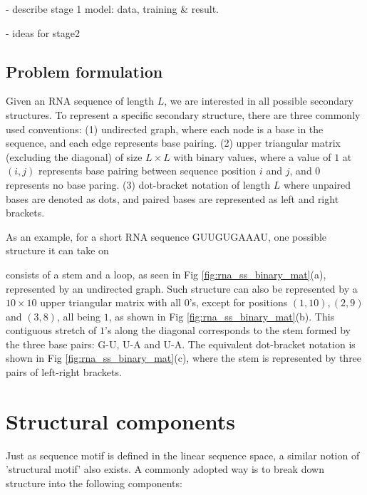 \documentclass[12pt]{article}
\begin{document}
- describe stage 1 model: data, training & result.


- ideas for stage2


\subsection{Problem formulation}

Given an RNA sequence of length $L$, we are interested in all possible secondary structures.
To represent a specific secondary structure, there are three commonly used conventions:
(1) undirected graph, where each node is a base in the sequence, and each edge represents base pairing.
(2) upper triangular matrix (excluding the diagonal)
of size $L \times L$ with binary values, where a value of $1$ at $(i, j)$ represents
base pairing between sequence position $i$ and $j$, and $0$ represents no base paring.
(3) dot-bracket notation of length $L$ where unpaired bases are denoted as dots,
    and paired bases are represented as left and right brackets.


As an example, for a short RNA sequence GUUGUGAAAU, one possible structure it can take on

consists of a stem and a loop, as seen in Fig \ref{fig:rna_ss_binary_mat}(a), represented by an undirected graph.
Such structure can also be represented by a $10 \times 10$ upper triangular matrix with all $0$'s,
except for positions
$(1, 10), (2, 9)$ and $(3, 8)$,
all being $1$, as shown in Fig \ref{fig:rna_ss_binary_mat}(b).
This contiguous stretch of $1$'s along the diagonal corresponds to the stem formed by the three base pairs: G-U, U-A and U-A.
The equivalent dot-bracket notation is shown in Fig \ref{fig:rna_ss_binary_mat}(c), where the stem is represented
by three pairs of left-right brackets.



\section{Structural components}


Just as sequence motif is defined in the linear sequence space,
a similar notion of 'structural motif' also exists.
A commonly adopted way is to break down structure into the following components:
\end{document}
